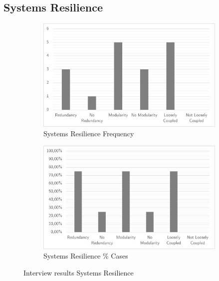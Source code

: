 \subsection{Systems Resilience}
\begin{figure}[H]
	\centering
	\begin{subfigure}[H]{0.5\textwidth}
		\centering
		\includegraphics[width=0.95\linewidth]{images/systemsresilience_frequency}
		\caption{Systems Resilience Frequency}
		\label{fig:systemsresiliencefrequency}
	\end{subfigure}%
	\begin{subfigure}[H]{0.5\textwidth}
		\centering
		\includegraphics[width=0.95\linewidth]{images/systemsresilience_cases}
		\caption{Systems Resilience \% Cases}
		\label{fig:systemsresiliencecases}
	\end{subfigure}
	\caption{Interview results Systems Resilience}
	\label{fig:interviewresultssystemsresilience}
\end{figure}

